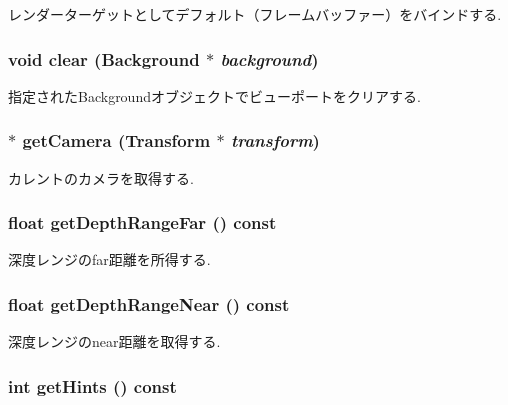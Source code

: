 レンダーターゲットとしてデフォルト（フレームバッファー）をバインドする. \hypertarget{classm3g_1_1Graphics3D_21c4a68a53cfbe0a7cec05d5a56682bf}{
\subsubsection[{clear}]{\setlength{\rightskip}{0pt plus 5cm}void clear ({\bf Background} $\ast$ {\em background})}}
\label{classm3g_1_1Graphics3D_21c4a68a53cfbe0a7cec05d5a56682bf}


指定されたBackgroundオブジェクトでビューポートをクリアする. \hypertarget{classm3g_1_1Graphics3D_1c6ba79e9112caef92e1a149a308b613}{
\subsubsection[{getCamera}]{ $\ast$ getCamera ({\bf Transform} $\ast$ {\em transform})}}
\label{classm3g_1_1Graphics3D_1c6ba79e9112caef92e1a149a308b613}


カレントのカメラを取得する. \hypertarget{classm3g_1_1Graphics3D_c8c185b99073215202d2e35723f5c470}{
\subsubsection[{getDepthRangeFar}]{\setlength{\rightskip}{0pt plus 5cm}float getDepthRangeFar () const}}
\label{classm3g_1_1Graphics3D_c8c185b99073215202d2e35723f5c470}


深度レンジのfar距離を所得する. \hypertarget{classm3g_1_1Graphics3D_60bc116f673bf2782de2df3eebfb2c92}{
\subsubsection[{getDepthRangeNear}]{\setlength{\rightskip}{0pt plus 5cm}float getDepthRangeNear () const}}
\label{classm3g_1_1Graphics3D_60bc116f673bf2782de2df3eebfb2c92}


深度レンジのnear距離を取得する. \hypertarget{classm3g_1_1Graphics3D_5837234a23dc5f46d3adec17f521b58e}{
\subsubsection[{getHints}]{\setlength{\rightskip}{0pt plus 5cm}int getHints () const}}
\label{classm3g_1_1Graphics3D_5837234a23dc5f46d3adec17f521b58e}


